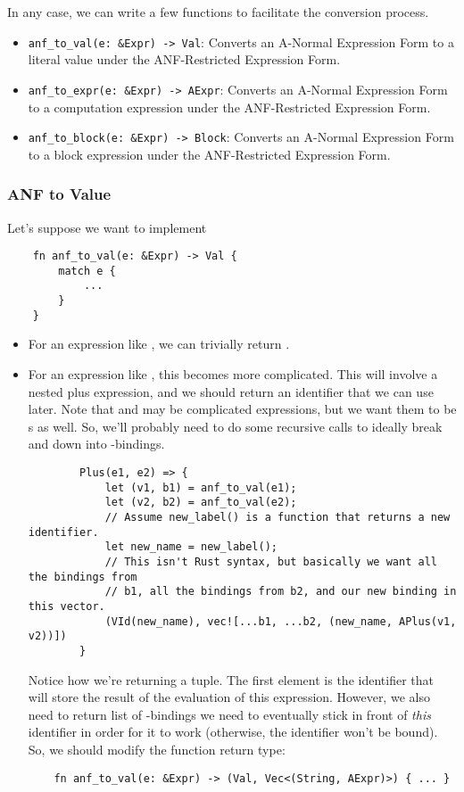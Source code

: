 \documentclass[letterpaper]{article}
\begin{document}
In any case, we can write a few functions to facilitate the conversion process.
\begin{itemize}
    \item \verb|anf_to_val(e: &Expr) -> Val|: Converts an A-Normal Expression Form to a literal value under the ANF-Restricted Expression Form.
    \item \verb|anf_to_expr(e: &Expr) -> AExpr|: Converts an A-Normal Expression Form to a computation expression under the ANF-Restricted Expression Form.
    \item \verb|anf_to_block(e: &Expr) -> Block|: Converts an A-Normal Expression Form to a block expression under the ANF-Restricted Expression Form. 
\end{itemize}

\subsubsection{ANF to Value}
Let's suppose we want to implement 
\begin{verbatim}
    fn anf_to_val(e: &Expr) -> Val {
        match e {
            ...
        }
    }\end{verbatim}

\begin{itemize}
    \item For an expression  like , we can trivially return .
    \item For an expression  like , this becomes more complicated. This will involve a nested plus expression, and we should return an identifier that we can use later. Note that  and  may be complicated expressions, but we want them to be s as well. So, we'll probably need to do some recursive calls to ideally break  and  down into -bindings. 
    \begin{verbatim}
        Plus(e1, e2) => {
            let (v1, b1) = anf_to_val(e1);
            let (v2, b2) = anf_to_val(e2);
            // Assume new_label() is a function that returns a new identifier.
            let new_name = new_label(); 
            // This isn't Rust syntax, but basically we want all the bindings from 
            // b1, all the bindings from b2, and our new binding in this vector.
            (VId(new_name), vec![...b1, ...b2, (new_name, APlus(v1, v2))])
        }\end{verbatim}
    Notice how we're returning a tuple. The first element is the identifier that will store the result of the evaluation of this expression. However, we also need to return list of -bindings we need to eventually stick in front of \emph{this} identifier in order for it to work (otherwise, the identifier won't be bound). So, we should modify the function return type: 
    \begin{verbatim}
    fn anf_to_val(e: &Expr) -> (Val, Vec<(String, AExpr)>) { ... }\end{verbatim}
\end{itemize}


\end{document}
